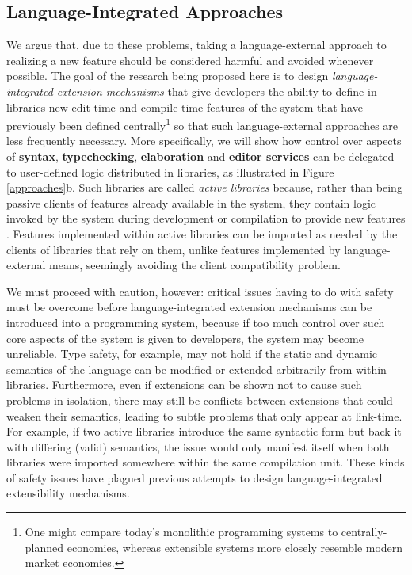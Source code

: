 \subsection{Language-Integrated Approaches}
We argue that, due to these problems, taking a language-external approach to realizing a new feature should be considered harmful and avoided whenever possible. The goal of the research being proposed here is to design \emph{language-integrated extension mechanisms} that give developers the ability to define in libraries new edit-time and compile-time features of the system that have previously been defined centrally\footnote{One might compare today's monolithic programming systems to  {centrally-planned} economies, whereas extensible\- systems more closely resemble modern market economies.} so that such language-external approaches are less frequently necessary. More specifically, we will show how control over aspects of \textbf{syntax}, \textbf{typechecking}, \textbf{elaboration} and \textbf{editor services} can be delegated to user-defined logic distributed in {libraries}, as illustrated in Figure \ref{approaches}b. 
Such libraries are called \emph{active libraries} because, rather than being passive clients of features already available in the system, they contain logic invoked by the system during development or compilation to provide new features  \cite{activelibraries}. Features implemented within active libraries can be imported as needed by the clients of libraries that rely on them, unlike features implemented by language-external means, seemingly avoiding the client compatibility problem.

We must proceed with caution, however: critical issues having to do with {safety} must be overcome before language-integrated extension mechanisms can be introduced into a programming system, because if too much control over such core aspects of the system is given  to developers, the system may become unreliable. 
Type safety, for example, may not hold if the static and dynamic semantics of the language can be modified or extended arbitrarily from within libraries. Furthermore, even if extensions can be shown not to cause such problems in isolation, there may still be conflicts between extensions that could weaken their semantics, leading to subtle problems that only appear at link-time. For example, if two active libraries introduce the same syntactic form but back it with differing (valid) semantics, the issue would only manifest itself when both libraries were imported somewhere within the same compilation unit. These kinds of safety issues have plagued previous attempts to design language-integrated extensibility mechanisms.%


